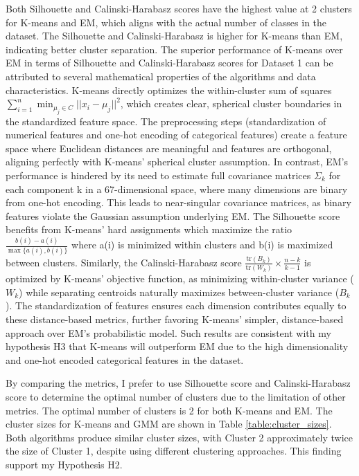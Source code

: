 \documentclass[conference]{IEEEtran}
\begin{document}
Both Silhouette and Calinski-Harabasz scores have the highest value at 2 clusters for K-means and EM, which aligns with the actual number of classes in the dataset. The Silhouette and Calinski-Harabasz is higher for K-means than EM, indicating better cluster separation. The superior performance of K-means over EM in terms of Silhouette and Calinski-Harabasz scores for Dataset 1 can be attributed to several mathematical properties of the algorithms and data characteristics. K-means directly optimizes the within-cluster sum of squares $\sum_{i=1}^n \min_{\mu_j \in C} ||x_i - \mu_j||^2$, which creates clear, spherical cluster boundaries in the standardized feature space. The preprocessing steps (standardization of numerical features and one-hot encoding of categorical features) create a feature space where Euclidean distances are meaningful and features are orthogonal, aligning perfectly with K-means' spherical cluster assumption. In contrast, EM's performance is hindered by its need to estimate full covariance matrices $\Sigma_k$ for each component k in a 67-dimensional space, where many dimensions are binary from one-hot encoding. This leads to near-singular covariance matrices, as binary features violate the Gaussian assumption underlying EM. The Silhouette score benefits from K-means' hard assignments which maximize the ratio $\frac{b(i) - a(i)}{\max\{a(i), b(i)\}}$ where a(i) is minimized within clusters and b(i) is maximized between clusters. Similarly, the Calinski-Harabasz score $\frac{\text{tr}(B_k)}{\text{tr}(W_k)} \times \frac{n-k}{k-1}$ is optimized by K-means' objective function, as minimizing within-cluster variance ($W_k$) while separating centroids naturally maximizes between-cluster variance ($B_k$). The standardization of features ensures each dimension contributes equally to these distance-based metrics, further favoring K-means' simpler, distance-based approach over EM's probabilistic model. Such results are consistent with my hypothesis H3 that K-means will outperform EM due to the high dimensionality and one-hot encoded categorical features in the dataset.

By comparing the metrics, I prefer to use Silhouette score and Calinski-Harabasz score to determine the optimal number of clusters due to the limitation of other metrics. The optimal number of clusters is 2 for both K-means and EM. The cluster sizes for K-means and GMM are shown in Table \ref{table:cluster_sizes}.
Both algorithms produce similar cluster sizes, with Cluster 2 approximately twice the size of Cluster 1, despite using different clustering approaches. This finding support my Hypothesis H2. 
\end{document}

